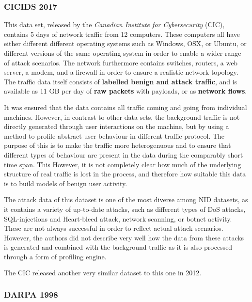 \documentclass[a4paper,12pt,twoside]{report}
\begin{document}
\subsubsection*{CICIDS 2017 \cite{gharib2016evaluation}\cite{sharafaldin2018towards}}

This data set, released by the \textit{Canadian Institute for Cybersecurity} (CIC), contains 5 days of network traffic from 12 computers. These computers all have either different different operating systems such as Windows, OSX, or Ubuntu, or different versions of the same operating system in order to enable a wider range of attack scenarios. The network  furthermore contains switches, routers, a web server, a modem, and a firewall in order to ensure a realistic network topology. The traffic data itself consists of \textbf{labelled benign and attack traffic}, and is available as 11 GB per day of \textbf{raw packets} with payloads, or as \textbf{network flows}. 

It was ensured that the data contains all traffic coming and going from individual machines. However, in contrast to other data sets, the background traffic is not directly generated through user interactions on the machine, but by using a method to profile abstract user behaviour in different traffic protocol. The purpose of this is to make the traffic more heterogenuous and to ensure that different types of behaviour are present in the data during the comparably short time span. This  However, it is not completely clear how much of the underlying structure of real traffic is lost in the process, and therefore how suitable this data is to build models of benign user activity.

The attack data of this dataset is one of the most diverse among NID datasets, as it contains a variety of up-to-date attacks, such as different types of DoS attacks, SQL-injections and Heart-bleed attack, network scanning, or botnet activity. These are not always successful in order to reflect actual attack scenarios. However, the authors did not describe very well how the data from these attacks is generated and combined with the background traffic as it is also processed through a form of profiling engine. 

The CIC released another very similar dataset to this one in 2012.

\subsubsection*{DARPA 1998 \cite{lippmann2000evaluating}}
\end{document}
